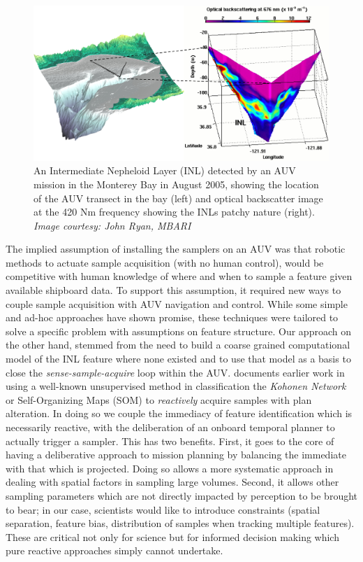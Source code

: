 \begin{figure}[b]
\centering
\includegraphics[scale=0.65]{figs/inl.jpg}
\caption{\small An Intermediate Nepheloid Layer (INL) detected by an
  AUV mission in the Monterey Bay in August 2005, showing the location
  of the AUV transect in the bay (left) and optical backscatter image
  at the 420 Nm frequency showing the INLs patchy nature
  (right). \emph{Image courtesy: John Ryan, MBARI}}
\label{fig:inl}
\end{figure}

The implied assumption of installing the samplers on an AUV was that
robotic methods to actuate sample acquisition (with no human control),
would be competitive with human knowledge of where and when to sample
a feature given available shipboard data. To support this assumption,
it required new ways to couple sample acquisition with AUV navigation
and control. While some simple and ad-hoc approaches \cite{yanwu10,
  yanwu11} have shown promise, these techniques were tailored to solve
a specific problem with assumptions on feature structure.  Our
approach on the other hand, stemmed from the need to build a coarse
grained computational model of the INL feature where none existed and
to use that model as a basis to close the \emph{sense-sample-acquire}
loop within the AUV. \cite{fox2007} documents earlier work in using a
well-known unsupervised method in classification the \emph{Kohonen
  Network} or Self-Organizing Maps (SOM) \cite{kohonen} to
\emph{reactively} acquire samples with plan alteration. In doing so we
couple the immediacy of feature identification which is necessarily
reactive, with the deliberation of an onboard temporal planner to
actually trigger a sampler. This has two benefits. First, it goes to
the core of having a deliberative approach to mission planning by
balancing the immediate with that which is projected. Doing so allows
a more systematic approach in dealing with spatial factors in sampling
large volumes. Second, it allows other sampling parameters which are
not directly impacted by perception to be brought to bear; in our
case, scientists would like to introduce constraints (spatial
separation, feature bias, distribution of samples when tracking
multiple features). These are critical not only for science but for
informed decision making which pure reactive approaches simply cannot
undertake.

